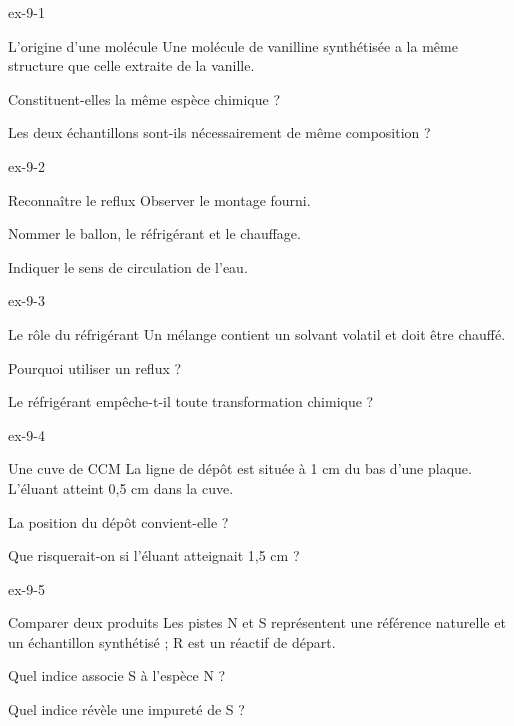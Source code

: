 \exercices
{}
\begin{blocLivre}{ex-9-1}\begin{exercice}[1]{L’origine d’une molécule}
Une molécule de vanilline synthétisée a la même structure que celle extraite de la vanille.
\begin{questions}
\item Constituent-elles la même espèce chimique ?
\item Les deux échantillons sont-ils nécessairement de même composition ?
\end{questions}
\end{exercice}\end{blocLivre}
\begin{blocLivre}{ex-9-2}\begin{exercice}[1]{Reconnaître le reflux}
Observer le montage fourni.
\begin{questions}
\item Nommer le ballon, le réfrigérant et le chauffage.
\item Indiquer le sens de circulation de l’eau.
\end{questions}
\end{exercice}\end{blocLivre}
\begin{blocLivre}{ex-9-3}\begin{exercice}[1]{Le rôle du réfrigérant}
Un mélange contient un solvant volatil et doit être chauffé.
\begin{questions}
\item Pourquoi utiliser un reflux ?
\item Le réfrigérant empêche-t-il toute transformation chimique ?
\end{questions}
\end{exercice}\end{blocLivre}
\begin{blocLivre}{ex-9-4}\begin{exercice}[1]{Une cuve de CCM}
La ligne de dépôt est située à 1 cm du bas d’une plaque. L’éluant atteint 0,5 cm dans la cuve.
\begin{questions}
\item La position du dépôt convient-elle ?
\item Que risquerait-on si l’éluant atteignait 1,5 cm ?
\end{questions}
\end{exercice}\end{blocLivre}
\begin{blocLivre}{ex-9-5}\begin{exercice}[2]{Comparer deux produits}
Les pistes N et S représentent une référence naturelle et un échantillon synthétisé ; R est un réactif de départ.
\begin{questions}
\item Quel indice associe S à l’espèce N ?
\item Quel indice révèle une impureté de S ?
\end{questions}
\end{exercice}\end{blocLivre}

